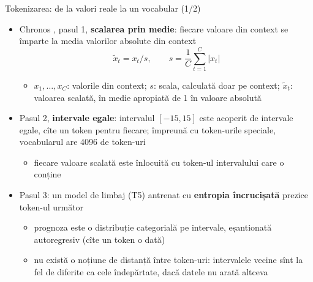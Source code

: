 \begin{frame}{Tokenizarea: de la valori reale la un vocabular (1/2)}
\itemsize{\small}
\begin{itemize}
    \item Chronos , pasul 1, \textbf{scalarea prin medie}: fiecare valoare din context se împarte la media valorilor absolute din context \[ \tilde x_t = x_t / s, \qquad s = \frac1C\sum_{t = 1}^{C}|x_t| \]
    \begin{itemize}
        \item $x_1, \dots, x_C$: valorile din context; $s$: scala, calculată doar pe context; $\tilde x_t$: valoarea scalată, în medie apropiată de 1 în valoare absolută
    \end{itemize}
    \item Pasul 2, \textbf{intervale egale}: intervalul $[-15, 15]$ este acoperit de intervale egale, cîte un token pentru fiecare; împreună cu token-urile speciale, vocabularul are 4096 de token-uri
    \begin{itemize}
        \item fiecare valoare scalată este înlocuită cu token-ul intervalului care o conține
    \end{itemize}
    \item Pasul 3: un model de limbaj (T5) antrenat cu \textbf{entropia încrucișată} prezice token-ul următor
    \begin{itemize}
        \item prognoza este o distribuție categorială pe intervale, eșantionată autoregresiv (cîte un token o dată)
        \item nu există o noțiune de distanță între token-uri: intervalele vecine sînt la fel de diferite ca cele îndepărtate, dacă datele nu arată altceva
    \end{itemize}
\end{itemize}
\end{frame}

